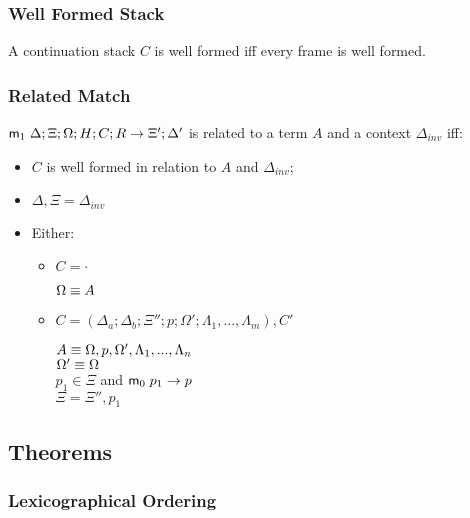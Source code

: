 \subsubsection{Well Formed Stack}

A continuation stack $C$ is well formed iff every frame is well formed.

\subsubsection{Related Match}\label{sec:related_match}

$\mathsf{m}_1 \; \Delta; \Xi; \Omega; H; C; R \rightarrow \Xi'; \Delta'$ is related to a term $A$ and a context $\Delta_{inv}$ iff:

\begin{itemize}
   \item $C$ is well formed in relation to $A$ and $\Delta_{inv}$;
   \item $\Delta, \Xi = \Delta_{inv}$
   \item Either:
   \begin{itemize}
      \item $C = \cdot$
   
      $\Omega \equiv A$
   
      \item $C = (\Delta_a; \Delta_b; \Xi''; p; \Omega'; \Lambda_1, ..., \Lambda_m), C'$
   
      $A \equiv \Omega, p, \Omega', \Lambda_1, ..., \Lambda_n$ \\
      $\Omega' \equiv \Omega$ \\ 
      $p_1 \in \Xi$ and $\mathsf{m}_0 \; p_1 \rightarrow p$ \\
      $\Xi = \Xi'', p_1$ \\
   \end{itemize}
\end{itemize}

\subsection{Theorems}

\subsubsection{Lexicographical Ordering}

